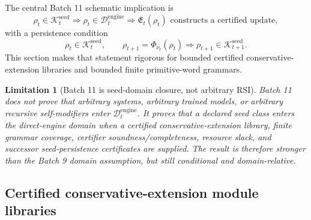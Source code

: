 \documentclass[11pt]{article}
\newtheorem{limitation}[theorem]{Limitation}
\newcommand{\1}{\mathbf{1}}
\providecommand{\Dcal}{\mathcal{D}}
\providecommand{\Kcal}{\mathcal{K}}
\begin{document}
The central Batch 11 schematic implication is
\[
\rho_t\in\Kcal_t^{\mathrm{seed}}
\Longrightarrow
\rho_t\in\Dcal_t^{\mathrm{engine}}
\Longrightarrow
\mathfrak E_t(\rho_t)\text{ constructs a certified update},
\]
with a persistence condition
\[
\rho_t\in\Kcal_t^{\mathrm{seed}},\qquad
\rho_{t+1}=\Phi_{\nu_t}(\rho_t)
\Longrightarrow
\rho_{t+1}\in\Kcal_{t+1}^{\mathrm{seed}}.
\]
This section makes that statement rigorous for bounded certified conservative-extension libraries and bounded finite primitive-word grammars.

\begin{limitation}[Batch 11 is seed-domain closure, not arbitrary RSI]
Batch 11 does not prove that arbitrary systems, arbitrary trained models, or arbitrary recursive self-modifiers enter \(\Dcal_t^{\mathrm{engine}}\).  It proves that a declared seed class enters the direct-engine domain when a certified conservative-extension library, finite grammar coverage, certifier soundness/completeness, resource slack, and successor seed-persistence certificates are supplied.  The result is therefore stronger than the Batch 9 domain assumption, but still conditional and domain-relative.
\end{limitation}

\subsection{Certified conservative-extension module libraries}
\end{document}

